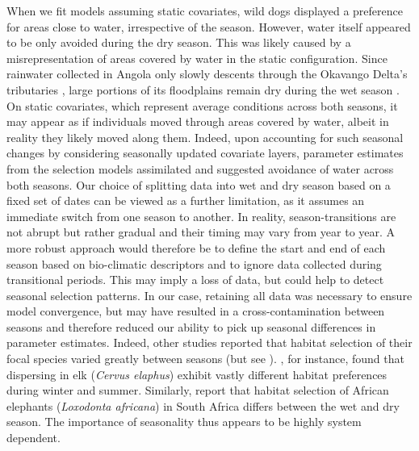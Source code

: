 \documentclass[abstract=on,10pt,a4paper,bibliography=totocnumbered]{article}
\begin{document}
When we fit models assuming static covariates, wild dogs displayed a preference
for areas close to water, irrespective of the season. However, water itself
appeared to be only avoided during the dry season. This was likely caused by a
misrepresentation of areas covered by water in the static configuration. Since
rainwater collected in Angola only slowly descents through the Okavango Delta's
tributaries \citep{McCarthy.1997}, large portions of its floodplains remain dry
during the wet season \cite{McCarthy.2003}. On static covariates, which
represent average conditions across both seasons, it may appear as if
individuals moved through areas covered by water, albeit in reality they likely
moved along them. Indeed, upon accounting for such seasonal changes by
considering seasonally updated covariate layers, parameter estimates from the
selection models assimilated and suggested avoidance of water across both
seasons. Our choice of splitting data into wet and dry season based on a fixed
set of dates can be viewed as a further limitation, as it assumes an immediate
switch from one season to another. In reality, season-transitions are not abrupt
but rather gradual and their timing may vary from year to year. A more robust
approach would therefore be to define the start and end of each season based on
bio-climatic descriptors and to ignore data collected during transitional
periods. This may imply a loss of data, but could help to detect seasonal
selection patterns. In our case, retaining all data was necessary to ensure
model convergence, but may have resulted in a cross-contamination between
seasons and therefore reduced our ability to pick up seasonal differences in
parameter estimates. Indeed, other studies reported that habitat selection of
their focal species varied greatly between seasons (but see
\citealp{Squires.2013}). \citet{Benz.2016}, for instance, found that dispersing
in elk (\textit{Cervus elaphus}) exhibit vastly different habitat preferences
during winter and summer. Similarly, \citet{Osipova.2019} report that habitat
selection of African elephants (\textit{Loxodonta africana}) in South Africa
differs between the wet and dry season. The importance of seasonality thus
appears to be highly system dependent.


\end{document}
